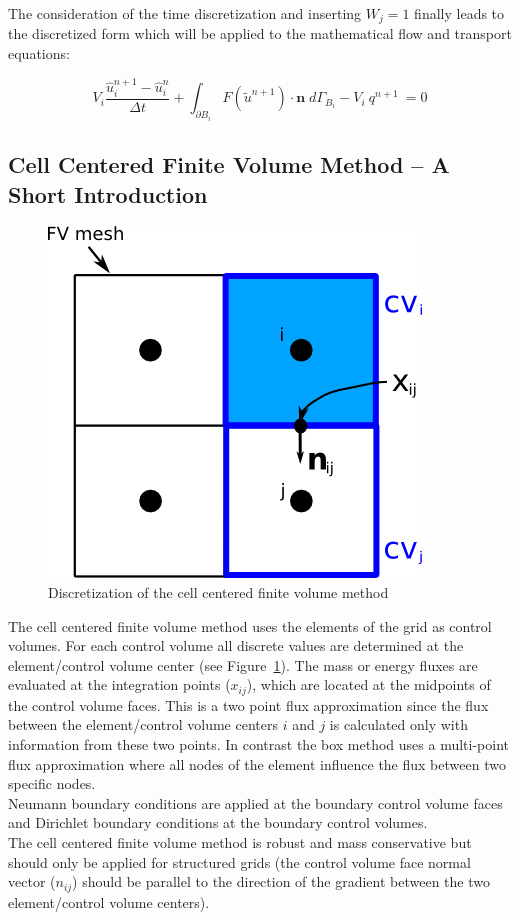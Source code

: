 The consideration of the time discretization and inserting $W_j = 1$ finally
leads to the discretized form which will be applied to the mathematical
flow and transport equations:

\begin{equation}
\label{eq:discfin}
	V_i \frac{\hat u_i^{n+1} - \hat u_i^{n}}{\Delta t}
	+ \int_{\partial B_i}  F(\tilde u^{n+1}) \cdot \mathbf n
	\;  d{\varGamma}_{B_i} - V_i \: q^{n+1} \: = 0
\end{equation}

\subsection{Cell Centered Finite Volume Method -- A Short Introduction}\label{cc}

\begin{figure} [ht]
\centering
\includegraphics[width=0.4\linewidth,keepaspectratio]{png/cc_disc.png}
\caption{\label{pc:cc} Discretization of the cell centered finite volume method}
\end{figure}

The cell centered finite volume method uses the elements of the grid as control volumes.
For each control volume all discrete values are determined at the element/control
volume center (see Figure~\ref{pc:cc}).
The mass or energy fluxes are evaluated at the integration points ($x_{ij}$),
which are located at the midpoints of the control
volume faces. This is a two point flux approximation since the flux between
the element/control volume centers $i$ and $j$ is calculated
only with information from these two points. In contrast the box method uses
a multi-point flux approximation where all nodes of the
element influence the flux between two specific nodes. \\
Neumann boundary conditions are applied at the boundary control volume faces
and Dirichlet boundary conditions at the boundary control volumes. \\
The cell centered finite volume method is robust and mass conservative but
should only be applied for structured grids
(the control volume face normal vector ($n_{ij}$) should be parallel to the
direction of the gradient between the two element/control
volume centers).


